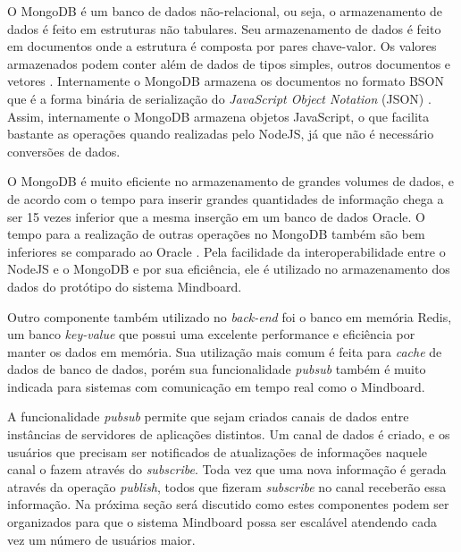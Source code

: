 O MongoDB é um banco de dados não-relacional, ou seja, o armazenamento de dados é feito em estruturas não tabulares. Seu armazenamento de dados é feito em documentos onde a estrutura é composta por pares chave-valor. Os valores armazenados podem conter além de dados de tipos simples, outros documentos e vetores \cite{mongodb_documentos}. Internamente o MongoDB armazena os documentos no formato BSON que é a forma binária de serialização do \emph{JavaScript Object Notation} (JSON) \cite{bson}. Assim, internamente o MongoDB armazena objetos JavaScript, o que facilita bastante as operações quando realizadas pelo NodeJS, já que não é necessário conversões de dados.

O MongoDB é muito eficiente no armazenamento de grandes volumes de dados, e de acordo com  o tempo para inserir grandes quantidades de informação chega a ser 15 vezes inferior que a mesma inserção em um banco de dados Oracle. O tempo para a realização de outras operações no MongoDB também são bem inferiores se comparado ao Oracle \cite{mongodb_oracle}. Pela facilidade da interoperabilidade entre o NodeJS e o MongoDB e por sua eficiência, ele é utilizado no armazenamento dos dados do protótipo do sistema Mindboard.

Outro componente também utilizado no \emph{back-end} foi o banco em memória Redis, um banco \emph{key-value} que possui uma excelente performance e eficiência por manter os dados em memória. Sua utilização mais comum é feita para \emph{cache} de dados de banco de dados, porém sua funcionalidade \emph{pubsub} também é muito indicada para sistemas com comunicação em tempo real como o Mindboard.

A funcionalidade \emph{pubsub} \cite{redis_pubsub} permite que sejam criados canais de dados entre instâncias de servidores de aplicações distintos. Um canal de dados é criado, e os usuários que precisam ser notificados de atualizações de informações naquele canal o fazem através do \emph{subscribe}. Toda vez que uma nova informação é gerada através da operação \emph{publish}, todos que fizeram \emph{subscribe} no canal receberão essa informação. Na próxima seção será discutido como estes componentes podem ser organizados para que o sistema Mindboard possa ser escalável atendendo cada vez um número de usuários maior.


